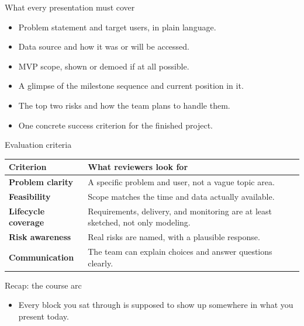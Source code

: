 \begin{frame}{What every presentation must cover}
\begin{itemize}
\item Problem statement and target users, in plain language.
\item Data source and how it was or will be accessed.
\item MVP scope, shown or demoed if at all possible.
\item A glimpse of the milestone sequence and current position in it.
\item The top two risks and how the team plans to handle them.
\item One concrete success criterion for the finished project.
\end{itemize}
\coursefooter
\end{frame}

\begin{frame}{Evaluation criteria}
\begin{tabularx}{\textwidth}{>{\bfseries}l X}
Criterion & What reviewers look for \\
\toprule
Problem clarity & A specific problem and user, not a vague topic area. \\
Feasibility & Scope matches the time and data actually available. \\
Lifecycle coverage & Requirements, delivery, and monitoring are at least sketched, not only modeling. \\
Risk awareness & Real risks are named, with a plausible response. \\
Communication & The team can explain choices and answer questions clearly. \\
\bottomrule
\end{tabularx}
\coursefooter
\end{frame}

\begin{frame}{Recap: the course arc}
\centering
{}
\vspace{0.4em}
\begin{itemize}
\item Every block you sat through is supposed to show up somewhere in what you present today.
\end{itemize}
\coursefooter
\end{frame}

